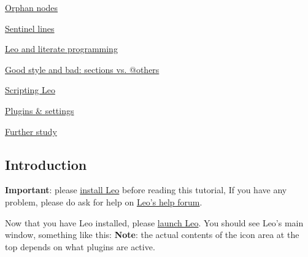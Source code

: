 \documentclass[10pt,a4paper,english]{article}
\begin{document}
\begin{list}{}{}
\begin{list}{}{}
\begin{list}{}{}
\begin{list}{}{}
\item {} \href{\#orphan-nodes}{Orphan nodes}

\item {} \href{\#sentinel-lines}{Sentinel lines}

\item {} \href{\#leo-and-literate-programming}{Leo and literate programming}

\end{list}

\item {} \href{\#good-style-and-bad-sections-vs-others}{Good style and bad:  sections vs. @others}

\item {} \href{\#scripting-leo}{Scripting Leo}

\item {} \href{\#plugins-settings}{Plugins {\&} settings}

\item {} \href{\#further-study}{Further study}

\end{list}

\end{list}

\end{list}




\hypertarget{introduction}{}
\subsection*{Introduction}

\textbf{Important}: please \href{install.html}{install Leo} before reading this tutorial,
If you have any problem, please do ask for help on \href{http://sourceforge.net/forum/forum.php?forum_id=10227}{Leo's help forum}.

Now that you have Leo installed, please \href{install.html\#running-leo}{launch Leo}.
You should see Leo's main window, something like this:
\textbf{Note}: the actual contents of the icon area at the top depends on what plugins are active.
\end{document}
